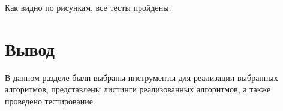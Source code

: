 \newpage
Как видно по рисункам, все тесты пройдены.

\section{Вывод}
В данном разделе были выбраны инструменты для реализации выбранных алгоритмов, представлены листинги реализованных алгоритмов, а также проведено тестирование.